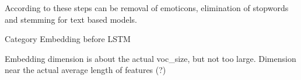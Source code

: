 According to \cite{alam2019impact} these steps can be removal of emoticons, elimination of stopwords and stemming for text based models.

Category Embedding before LSTM


Embedding dimension is about the actual voc\_size, but not too large.
Dimension near the actual average length of features (?)

